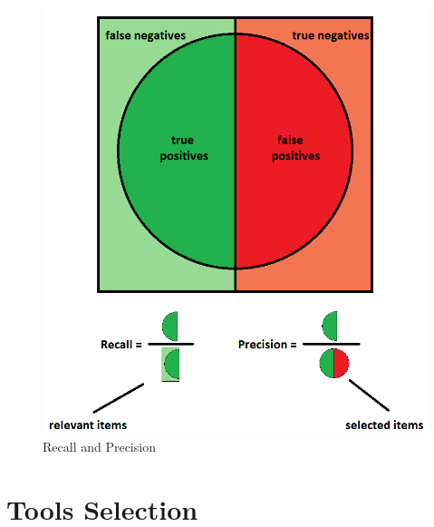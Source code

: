 \begin{figure}[H]
    \centering
    \includegraphics[scale=0.5]{images/rpl}
    \caption{Recall and Precision}
    \label{fig:RPL}
\end{figure}

\section{Tools Selection}
\label{sec:tools}

